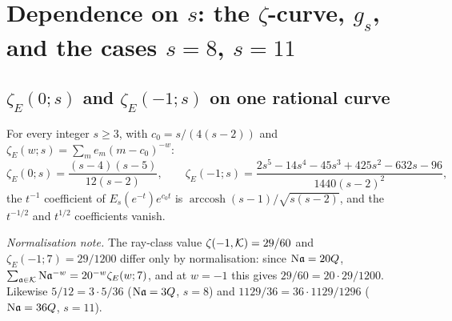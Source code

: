 \section{Dependence on $s$: the $\zeta$-curve, $g_s$, and the cases $s=8$, $s=11$}\label{sec:sfamily}
\subsection{$\zeta_E(0;s)$ and $\zeta_E(-1;s)$ on one rational curve}\label{app:zeta}
\begin{theorem}\label{thm:zetacurve}
For every integer $s\ge3$, with $c_0=s/(4(s-2))$ and $\zeta_E(w;s)=\sum_m e_m(m-c_0)^{-w}$:
\[\zeta_E(0;s)=\frac{(s-4)(s-5)}{12(s-2)},\qquad
\zeta_E(-1;s)=\frac{2s^5-14s^4-45s^3+425s^2-632s-96}{1440(s-2)^2},\]
the $t^{-1}$ coefficient of $E_s(e^{-t})e^{c_0t}$ is $\operatorname{arccosh}(s-1)/\sqrt{s(s-2)}$, and the $t^{-1/2}$ and $t^{1/2}$ coefficients vanish.
\end{theorem}
\noindent\emph{Normalisation note.} The ray-class value $\zeta(-1,\mathcal{K})=29/60$ and $\zeta_E(-1;7)=29/1200$ differ only by normalisation: since
$\mathrm{N}\mathfrak{a}=20Q$, $\sum_{\mathfrak{a}\in\mathcal{K}}\mathrm{N}\mathfrak{a}^{-w}=20^{-w}\zeta_E(w;7)$, and at $w=-1$ this gives $29/60=20\cdot29/1200$. Likewise $5/12=3\cdot5/36$
($\mathrm{N}\mathfrak{a}=3Q$, $s=8$) and $1129/36=36\cdot1129/1296$ ($\mathrm{N}\mathfrak{a}=36Q$, $s=11$).

